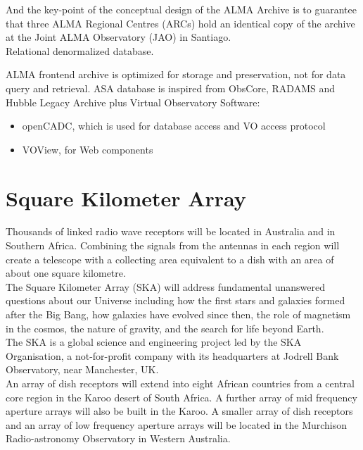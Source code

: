 And the key-point of the conceptual design of the ALMA Archive is to guarantee that three ALMA Regional Centres (ARCs) hold an identical copy of the archive at the Joint ALMA Observatory (JAO) in Santiago. \\

Relational denormalized database.

ALMA frontend archive is optimized for storage and preservation, not for data query and retrieval. ASA database is inspired from ObsCore, RADAMS and Hubble Legacy Archive plus Virtual Observatory Software:

\begin{itemize}
\item openCADC, which is used for database access and VO access protocol
\item VOView, for Web components
\end{itemize}




\section{Square Kilometer Array}

Thousands of linked radio wave receptors will be located in Australia and in Southern Africa. Combining the signals from the antennas in each region will create a telescope with a collecting area equivalent to a dish with an area of about one square kilometre. \\

The Square Kilometer Array (SKA) will address fundamental unanswered questions about our Universe including how the first stars and galaxies formed after the Big Bang, how galaxies have evolved since then, the role of magnetism in the cosmos, the nature of gravity, and the search for life beyond Earth. \\

The SKA is a global science and engineering project led by the SKA Organisation, a not-for-profit company with its headquarters at Jodrell Bank Observatory, near Manchester, UK. \\

An array of dish receptors will extend into eight African countries from a central core region in the Karoo desert of South Africa. A further array of mid frequency aperture arrays will also be built in the Karoo. A smaller array of dish receptors and an array of low frequency aperture arrays will be located in the Murchison Radio-astronomy Observatory in Western Australia.\\

